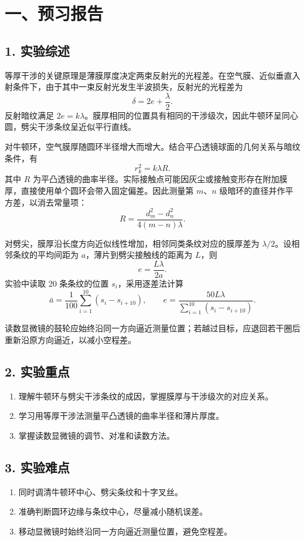 \section*{一、预习报告}

\subsection*{1. 实验综述}

等厚干涉的关键原理是薄膜厚度决定两束反射光的光程差。在空气膜、近似垂直入射条件下，由于其中一束反射光发生半波损失，反射光的光程差为
\begin{equation}
  \delta=2e+\frac{\lambda}{2}.
\end{equation}
反射暗纹满足 $2e=k\lambda$。膜厚相同的位置具有相同的干涉级次，因此牛顿环呈同心圆，劈尖干涉条纹呈近似平行直线。

对牛顿环，空气膜厚随圆环半径增大而增大。结合平凸透镜球面的几何关系与暗纹条件，有
\begin{equation}
  r_k^2=k\lambda R.
\end{equation}
其中 $R$ 为平凸透镜的曲率半径。实际接触点可能因灰尘或接触变形存在附加膜厚，直接使用单个圆环会带入固定偏差。因此测量第 $m$、$n$ 级暗环的直径并作平方差，以消去常量项：
\begin{equation}
  R=\frac{d_m^2-d_n^2}{4(m-n)\lambda}.
\end{equation}

对劈尖，膜厚沿长度方向近似线性增加，相邻同类条纹对应的膜厚差为 $\lambda/2$。设相邻条纹的平均间距为 $a$，薄片到劈尖接触线的距离为 $L$，则
\begin{equation}
  e=\frac{L\lambda}{2a}.
\end{equation}
实验中读取 20 条条纹的位置 $s_i$，采用逐差法计算
\begin{equation}
  \bar a=\frac{1}{100}\sum_{i=1}^{10}(s_i-s_{i+10}),\qquad
  e=\frac{50L\lambda}{\sum_{i=1}^{10}(s_i-s_{i+10})}.
\end{equation}

读数显微镜的鼓轮应始终沿同一方向逼近测量位置；若越过目标，应退回若干圈后重新沿原方向逼近，以减小空程差。

\subsection*{2. 实验重点}

\begin{enumerate}
  \item 理解牛顿环与劈尖干涉条纹的成因，掌握膜厚与干涉级次的对应关系。
  \item 学习用等厚干涉法测量平凸透镜的曲率半径和薄片厚度。
  \item 掌握读数显微镜的调节、对准和读数方法。
\end{enumerate}

\subsection*{3. 实验难点}

\begin{enumerate}
  \item 同时调清牛顿环中心、劈尖条纹和十字叉丝。
  \item 准确判断圆环边缘与条纹中心，尽量减小随机误差。
  \item 移动显微镜时始终沿同一方向逼近测量位置，避免空程差。
\end{enumerate}

